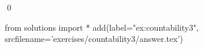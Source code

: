 
\begin{ex} 
  \label{ex:countability3}
  
  \qed
\end{ex} 
\begin{python0}
from solutions import *
add(label="ex:countability3",
    srcfilename='exercises/countability3/answer.tex') 
\end{python0}
